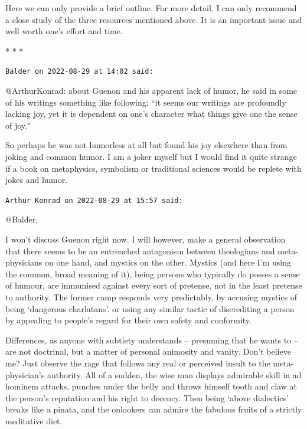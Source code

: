 Here we can only provide a brief outline. For more detail, I can only recommend a close study of the three resources mentioned above. It is an important issue and well worth one's effort and time.




\begin{center}* * *\end{center}

\begin{footnotesize}\begin{sffamily}



\texttt{Balder on 2022-08-29 at 14:02 said: }

@ArthurKonrad: about Guenon and his apparent lack of humor, he said in some of his writings something like following: ``it seems our writings are profoundly lacking joy, yet it is dependent on one's character what things give one the sense of joy."

So perhaps he was not humorless at all but found his joy elsewhere than from joking and common humor. I am a joker myself but I would find it quite strange if a book on metaphysics, symbolism or traditional sciences would be replete with jokes and humor.


\hfill

\texttt{Arthur Konrad on 2022-08-29 at 15:57 said: }

@Balder,

I won't discuss Guenon right now. I will however, make a general observation that there seems to be an entrenched antagonism between theologians and meta-physicians on one hand, and mystics on the other. Mystics (and here I'm using the common, broad meaning of it), being persons who typically do posses a sense of humour, are immunised against every sort of pretense, not in the least pretense to authority. The former camp responds very predictably, by accusing mystics of being `dangerous charlatans'. or using any similar tactic of discrediting a person by appealing to people's regard for their own safety and conformity.

Differences, as anyone with subtlety understands – presuming that he wants to – are not doctrinal, but a matter of personal animosity and vanity. Don't believe me? Just observe the rage that follows any real or perceived insult to the meta-physician's authority. All of a sudden, the wise man displays admirable skill in ad hominem attacks, punches under the belly and throws himself tooth and claw at the person's reputation and his right to decency. Then being `above dialectics' breaks like a pinata, and the onlookers can admire the fabulous fruits of a strictly meditative diet.


\end{sffamily}
\end{footnotesize}
